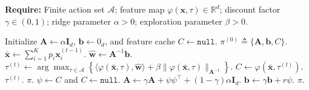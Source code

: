\begin{algorithm}[t]
\caption{(Contextual case; round-wise) Discounted LinUCB}
\label{alg:dlinucb_round}
\textbf{Require:} Finite action set $\mathcal A$; feature map $\varphi(\boldsymbol{x},\tau)\in\mathbb R^d$; discount factor $\gamma\in(0,1)$; ridge parameter $\alpha>0$; exploration parameter $\beta>0$.
\begin{algorithmic}[1]
    \State Initialize $\boldsymbol{A}\gets \alpha \boldsymbol{I}_d$, $\boldsymbol{b}\gets 0_d$, and feature cache $C\gets \texttt{null}$.
    \State \Return $\pi^{(0)} \triangleq \{\boldsymbol{A},\boldsymbol{b},C\}$.
\EndProcedure
{}
    \State $\bar{\boldsymbol{x}} \gets \sum_{i=1}^K p_i \boldsymbol{x}_i^{(t-1)}$.
    \State $\hat{\boldsymbol{w}} \gets \boldsymbol{A}^{-1}\boldsymbol{b}$.
    \State $\tau^{(t)} \gets \arg\max_{\tau\in\mathcal A}\left\{\langle \varphi(\bar{\boldsymbol{x}},\tau),\hat{\boldsymbol{w}}\rangle
    + \beta \|\varphi(\bar {\boldsymbol{x}},\tau)\|_{\boldsymbol{A}^{-1}}\right\}$.
    \State $C \gets \varphi(\bar{\boldsymbol{x}},\tau^{(t)})$.
    \State \Return $\tau^{(t)}$.
\EndProcedure
{}
     \State \Return $\pi$. \EndIf
    \State $\psi \gets C$ and $C\gets \texttt{null}$.
    \State $\boldsymbol{A} \gets \gamma \boldsymbol{A} + \psi\psi^\top + (1-\gamma)\alpha \boldsymbol{I}_d$.
    \State $\boldsymbol{b} \gets \gamma \boldsymbol{b} + r\psi$.
    \State \Return $\pi$.
\EndProcedure
\end{algorithmic}
\end{algorithm}